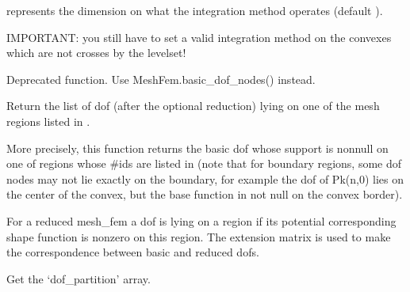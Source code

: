 \documentclass[a4paper,11pt,english]{sphinxmanual}
\begin{document}
\begin{fulllineitems}
\begin{fulllineitems}
 represents the dimension on what the integration method
operates (default ).

IMPORTANT: you still have to set a valid integration method on
the convexes which are not crosses by the levelset!

\end{fulllineitems}


\begin{fulllineitems}
\label{\detokenize{python/cmdref_MeshFem:getfem.MeshFem.dof_nodes}}
Deprecated function. Use MeshFem.basic\_dof\_nodes() instead.

\end{fulllineitems}


\begin{fulllineitems}
\label{\detokenize{python/cmdref_MeshFem:getfem.MeshFem.dof_on_region}}
Return the list of dof (after the optional reduction) lying on one
of the mesh regions listed in .

More precisely, this function returns the basic dof whose support is
non\sphinxhyphen{}null on one of regions whose \#ids are listed in  (note
that for boundary regions, some dof nodes may not lie exactly
on the boundary, for example the dof of Pk(n,0) lies on the center
of the convex, but the base function in not null on the convex
border).

For a reduced mesh\_fem
a dof is lying on a region if its potential corresponding shape
function is nonzero on this region. The extension matrix is used
to make the correspondence between basic and reduced dofs.

\end{fulllineitems}


\begin{fulllineitems}
\label{\detokenize{python/cmdref_MeshFem:getfem.MeshFem.dof_partition}}
Get the ‘dof\_partition’ array.


\end{fulllineitems}
\end{fulllineitems}
\end{document}
